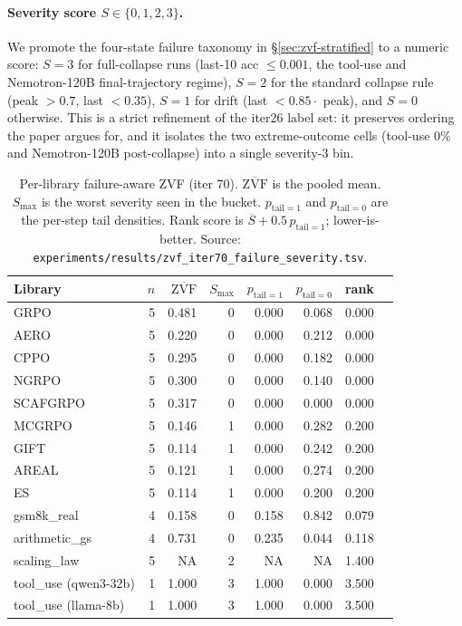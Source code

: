 \paragraph{Severity score $S \in \{0,1,2,3\}$.}
We promote the four-state failure taxonomy in
\S\ref{sec:zvf-stratified} to a numeric score: $S=3$ for
full-collapse runs (last-10 acc $\leq 0.001$, the
tool-use and Nemotron-120B final-trajectory regime), $S=2$ for
the standard collapse rule (peak $\!>\!0.7$, last $\!<\!0.35$),
$S=1$ for drift (last $\!<\!0.85 \cdot$ peak), and $S=0$ otherwise.
This is a strict refinement of the iter26 label set: it preserves
ordering the paper argues for, and it isolates the two
extreme-outcome cells (tool-use 0\% and Nemotron-120B
post-collapse) into a single severity-3 bin.

\begin{table}[htbp]
\centering\small\setlength{\tabcolsep}{4pt}
\begin{tabular}{lrrrrrrr}
\hline
Library & $n$ & $\overline{\mathrm{ZVF}}$ & $S_{\max}$ & $p_{\mathrm{tail}=1}$ & $p_{\mathrm{tail}=0}$ & rank &  \\
\hline
GRPO       & 5 & 0.481 & 0 & 0.000 & 0.068 & 0.000 & \\
AERO       & 5 & 0.220 & 0 & 0.000 & 0.212 & 0.000 & \\
CPPO       & 5 & 0.295 & 0 & 0.000 & 0.182 & 0.000 & \\
NGRPO      & 5 & 0.300 & 0 & 0.000 & 0.140 & 0.000 & \\
SCAFGRPO   & 5 & 0.317 & 0 & 0.000 & 0.000 & 0.000 & \\
MCGRPO     & 5 & 0.146 & 1 & 0.000 & 0.282 & 0.200 & \\
GIFT       & 5 & 0.114 & 1 & 0.000 & 0.242 & 0.200 & \\
AREAL      & 5 & 0.121 & 1 & 0.000 & 0.274 & 0.200 & \\
ES         & 5 & 0.114 & 1 & 0.000 & 0.200 & 0.200 & \\
gsm8k\_real     & 4 & 0.158 & 0 & 0.158 & 0.842 & 0.079 & \\
arithmetic\_gs  & 4 & 0.731 & 0 & 0.235 & 0.044 & 0.118 & \\
scaling\_law    & 5 & NA    & 2 & NA    & NA    & 1.400 & \\
tool\_use (qwen3-32b)  & 1 & 1.000 & 3 & 1.000 & 0.000 & 3.500 & \\
tool\_use (llama-8b)   & 1 & 1.000 & 3 & 1.000 & 0.000 & 3.500 & \\
\hline
\end{tabular}
\caption{Per-library failure-aware ZVF (iter 70).
$\overline{\mathrm{ZVF}}$ is the pooled mean. $S_{\max}$ is the
worst severity seen in the bucket. $p_{\mathrm{tail}=1}$ and
$p_{\mathrm{tail}=0}$ are the per-step tail densities. Rank score
is $\overline{S} + 0.5\,p_{\mathrm{tail}=1}$; lower-is-better.
Source: \texttt{experiments/results/zvf\_iter70\_failure\_severity.tsv}.}
\label{tab:zvf70-severity}
\end{table}

